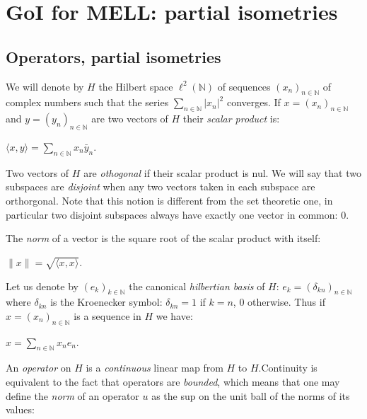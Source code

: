 \section{GoI for MELL: partial isometries}\label{goi-for-mell-partial-isometries}


\subsection{Operators, partial isometries}\label{operators-partial-isometries}

We will denote by \(H\) the Hilbert space \(\ell^2(\mathbb{N})\) of
sequences \((x_n)_{n\in\mathbb{N}}\) of complex numbers such that the
series \(\sum_{n\in\mathbb{N}}|x_n|^2\) converges. If
\(x = (x_n)_{n\in\mathbb{N}}\) and \(y = (y_n)_{n\in\mathbb{N}}\) are
two vectors of \(H\) their \emph{scalar product} is:

\begin{description}
\tightlist
\item[]
\(\langle x, y\rangle = \sum_{n\in\mathbb{N}} x_n\bar y_n\).
\end{description}

Two vectors of \(H\) are \emph{othogonal} if their scalar product is
nul. We will say that two subspaces are \emph{disjoint} when any two
vectors taken in each subspace are orthorgonal. Note that this notion is
different from the set theoretic one, in particular two disjoint
subspaces always have exactly one vector in common: \(0\).

The \emph{norm} of a vector is the square root of the scalar product
with itself:

\begin{description}
\tightlist
\item[]
\(\|x\| = \sqrt{\langle x, x\rangle}\).
\end{description}

Let us denote by \((e_k)_{k\in\mathbb{N}}\) the canonical
\emph{hilbertian basis} of \(H\):
\(e_k = (\delta_{kn})_{n\in\mathbb{N}}\) where \(\delta_{kn}\) is the
Kroenecker symbol: \(\delta_{kn}=1\) if \(k=n\), \(0\) otherwise. Thus
if \(x=(x_n)_{n\in\mathbb{N}}\) is a sequence in \(H\) we have:

\begin{description}
\tightlist
\item[]
\(x = \sum_{n\in\mathbb{N}} x_ne_n\).
\end{description}

An \emph{operator} on \(H\) is a \emph{continuous} linear map from \(H\)
to \(H\).Continuity is equivalent to the fact that operators are
\emph{bounded}, which means that one may define the \emph{norm} of an
operator \(u\) as the sup on the unit ball of the norms of its values:

